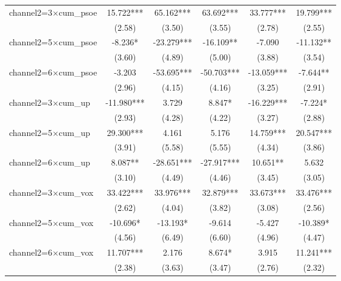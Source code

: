 \begin{tabular}{l*{5}{c}}
channel2=3$\times$cum\_psoe&      15.722***&      65.162***&      63.692***&      33.777***&      19.799***\\
                    &      (2.58)   &      (3.50)   &      (3.55)   &      (2.78)   &      (2.55)   \\
channel2=5$\times$cum\_psoe&      -8.236*  &     -23.279***&     -16.109** &      -7.090   &     -11.132** \\
                    &      (3.60)   &      (4.89)   &      (5.00)   &      (3.88)   &      (3.54)   \\
channel2=6$\times$cum\_psoe&      -3.203   &     -53.695***&     -50.703***&     -13.059***&      -7.644** \\
                    &      (2.96)   &      (4.15)   &      (4.16)   &      (3.25)   &      (2.91)   \\
channel2=3$\times$cum\_up&     -11.980***&       3.729   &       8.847*  &     -16.229***&      -7.224*  \\
                    &      (2.93)   &      (4.28)   &      (4.22)   &      (3.27)   &      (2.88)   \\
channel2=5$\times$cum\_up&      29.300***&       4.161   &       5.176   &      14.759***&      20.547***\\
                    &      (3.91)   &      (5.58)   &      (5.55)   &      (4.34)   &      (3.86)   \\
channel2=6$\times$cum\_up&       8.087** &     -28.651***&     -27.917***&      10.651** &       5.632   \\
                    &      (3.10)   &      (4.49)   &      (4.46)   &      (3.45)   &      (3.05)   \\
channel2=3$\times$cum\_vox&      33.422***&      33.976***&      32.879***&      33.673***&      33.476***\\
                    &      (2.62)   &      (4.04)   &      (3.82)   &      (3.08)   &      (2.56)   \\
channel2=5$\times$cum\_vox&     -10.696*  &     -13.193*  &      -9.614   &      -5.427   &     -10.389*  \\
                    &      (4.56)   &      (6.49)   &      (6.60)   &      (4.96)   &      (4.47)   \\
channel2=6$\times$cum\_vox&      11.707***&       2.176   &       8.674*  &       3.915   &      11.241***\\
                    &      (2.38)   &      (3.63)   &      (3.47)   &      (2.76)   &      (2.32)   \\

\end{tabular}
